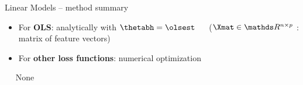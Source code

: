 \begin{vbframe}{Linear Models -- method summary}
\begin{itemize}
  \item For \textbf{OLS}: analytically with 
  $\thetabh = \olsest$ ~~
  ($\Xmat \in \R^{n \times p}$ : matrix of feature vectors)
  \item For \textbf{other loss functions}: numerical optimization 
\end{itemize}

\medskip

 ~~ None

\medskip


\end{vbframe}


